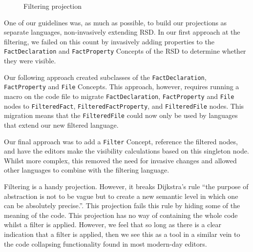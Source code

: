 \begin{figure}
    \centering
    \caption{Filtering projection}
    \label{fig:filteringProjection}
\end{figure}

One of our guidelines was, as much as possible, to build our projections as separate languages, non-invasively extending RSD.
In our first approach at the filtering, we failed on this count by invasively adding properties to the \texttt{FactDeclaration} and \texttt{FactProperty} Concepts of the RSD to determine whether they were visible.

Our following approach created subclasses of the \texttt{FactDeclaration}, \texttt{FactProperty} and \texttt{File} Concepts.
This approach, however, requires running a macro on the code file to migrate \texttt{FactDeclaration}, \texttt{FactProperty} and \texttt{File} nodes to \texttt{FilteredFact}, \texttt{FilteredFactProperty}, and \texttt{FilteredFile} nodes.
This migration means that the \texttt{FilteredFile} could now only be used by languages that extend our new filtered language.

Our final approach was to add a \texttt{Filter} Concept, reference the filtered nodes, and have the editors make the visibility calculations based on this singleton node.
Whilst more complex, this removed the need for invasive changes and allowed other languages to combine with the filtering language.

Filtering is a handy projection.
However, it breaks Dijkstra's rule ``the purpose of abstraction is not to be vague but to create a new semantic level in which one can be absolutely precise.''\cite{dijkstra1972humble}.
This projection fails this rule by hiding some of the meaning of the code.
This projection has no way of containing the whole code whilst a filter is applied.
However, we feel that so long as there is a clear indication that a filter is applied, then we see this as a tool in a similar vein to the code collapsing functionality found in most modern-day editors.

